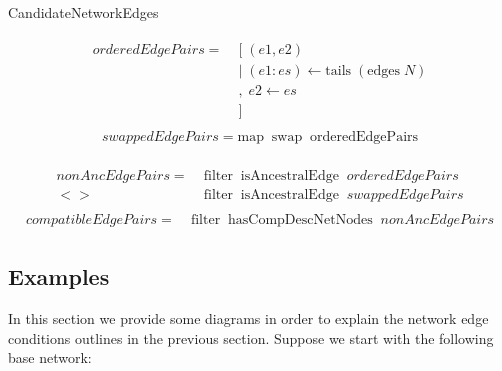 \documentclass[11pt]{article}
\begin{document}
\begin{algorithm}
		\caption{CandidateNetworkEdges}
		\label{alg:CandidateNetworkEdges}
		\SetAlgoLined
        \begin{align*}
        \begin{split}
         orderedEdgePairs =\; & [\; (e1, e2)\\
                               & |\; (e1 : es) \leftarrow \mathrm{tails}\; (\mathrm{edges}\; N)\\
                               & ,\; e2 \leftarrow es\\
                               & ]
        \end{split}
        \end{align*}
        \begin{align*}
        \begin{split}
        swappedEdgePairs = \mathrm{map\;\;swap\;\;orderedEdgePairs}
        \end{split}
        \end{align*}

        \begin{align*}
        \begin{split}
        nonAncEdgePairs =\;& \mathrm{filter\;\;isAncestralEdge\;\;}orderedEdgePairs\\
                         <>\;\; & \mathrm{filter\;\;isAncestralEdge\;\;}swappedEdgePairs
        \end{split}
        \end{align*}
        \begin{align*}
        \begin{split}
        compatibleEdgePairs =\;& \mathrm{filter\;\;hasCompDescNetNodes\;\;}nonAncEdgePairs
        \end{split}
        \end{align*}


	\end{algorithm}


\subsection{Examples}
In this section we provide some diagrams in order to explain the network edge conditions outlines in the previous section. Suppose we start with the following base network:
\end{document}
